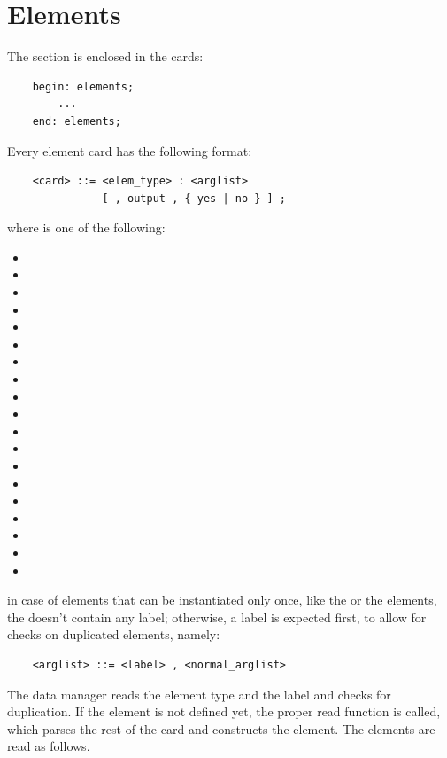 \chapter{Elements}\label{sec:ELEMENTS}
The  section is enclosed in the cards:
\begin{verbatim}
    begin: elements;
        ...
    end: elements;
\end{verbatim}
Every element card has the following format:
\begin{verbatim}
    <card> ::= <elem_type> : <arglist>
               [ , output , { yes | no } ] ;
\end{verbatim}
where  is one of the following:
\begin{itemize}
\item {}
\item {}
\item {}
\item {}
\item {}
\item {}
\item {}
\item {}
\item {}
\item {}
\item {}
\item {}
\item {}
\item {}
\item {}
\item {}
\item {}
\item {}
\item {}
\end{itemize}
in case of elements that can be instantiated only once, like
the  or the  elements, the 
doesn't contain any label; otherwise, a label is expected first, to allow 
for checks on duplicated elements, namely: 
\begin{verbatim}
    <arglist> ::= <label> , <normal_arglist>
\end{verbatim}
The data manager reads the element type and the label and checks for
duplication. If the element is not defined yet, the proper read function is
called, which parses the rest of the card and constructs the element.
The elements are read as follows.



